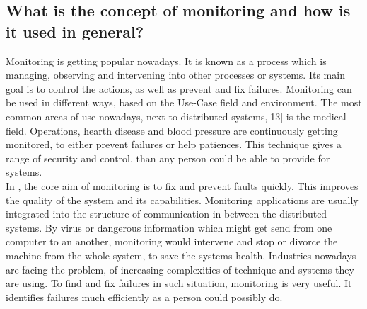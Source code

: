 \subsection{What is the concept of monitoring and how is it used in general?}
\label{subsec:ConceptMonitoring}

Monitoring is getting popular nowadays. It is known as a process which is managing, observing and intervening into other processes or systems.\cite{Jammes2012} Its main goal is to control the actions, as well as prevent and fix failures.\cite{Dinu2011} Monitoring can be used in different ways, based on the Use-Case field and environment.\cite{Dinu2011} The most common areas of use nowadays, next to distributed systems,[13] is the medical field. Operations, hearth disease and blood pressure are continuously getting monitored, to either prevent failures or help patiences. This technique gives a range of security and control, than any person could be able to provide for systems.\cite{Jammes2012}
\\
 In \isds, the core aim of monitoring is to fix and prevent faults quickly. This improves the quality of the system and its capabilities. Monitoring applications are usually integrated into the structure of communication in between the distributed systems.\cite{Jammes2012} By virus or dangerous information which might get send from one computer to an another, monitoring would intervene and stop or divorce the machine from the whole system, to save the systems health. Industries nowadays are facing the problem, of increasing complexities of technique and systems they are using.\cite{Jammes2012} To find and fix failures in such situation, monitoring is very useful. It identifies failures much efficiently as a person could possibly do.\cite{Jammes2012}
 
